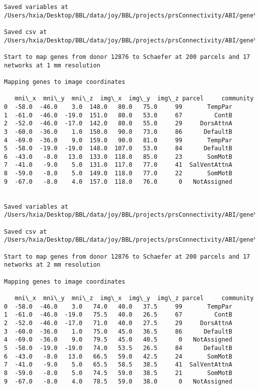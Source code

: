 \documentclass[11pt]{article}
\begin{document}
\begin{Verbatim}[commandchars=\\\{\}]
Saved variables at /Users/hxia/Desktop/BBL/data/joy/BBL/projects/prsConnectivity/ABI/gene\_mapping/12876donor\_200Parcels\_7Network\_2mm.pkl

Saved csv at /Users/hxia/Desktop/BBL/data/joy/BBL/projects/prsConnectivity/ABI/gene\_mapping/12876donor\_200Parcels\_7Network\_2mm.csv

Start to map genes from donor 12876 to Schaefer at 200 parcels and 17 networks at 1 mm resolution

Mapping genes to image coordinates

   mni\_x  mni\_y  mni\_z  img\_x  img\_y  img\_z parcel     community
0  -58.0  -46.0    3.0  148.0   80.0   75.0     99       TempPar
1  -61.0  -46.0  -19.0  151.0   80.0   53.0     67         ContB
2  -52.0  -46.0  -17.0  142.0   80.0   55.0     29     DorsAttnA
3  -60.0  -36.0    1.0  150.0   90.0   73.0     86      DefaultB
4  -69.0  -36.0    9.0  159.0   90.0   81.0     99       TempPar
5  -58.0  -19.0  -19.0  148.0  107.0   53.0     84      DefaultB
6  -43.0   -8.0   13.0  133.0  118.0   85.0     23       SomMotB
7  -41.0   -9.0    5.0  131.0  117.0   77.0     41  SalVentAttnA
8  -59.0   -8.0    5.0  149.0  118.0   77.0     22       SomMotB
9  -67.0   -8.0    4.0  157.0  118.0   76.0      0   NotAssigned


Saved variables at /Users/hxia/Desktop/BBL/data/joy/BBL/projects/prsConnectivity/ABI/gene\_mapping/12876donor\_200Parcels\_17Network\_1mm.pkl

Saved csv at /Users/hxia/Desktop/BBL/data/joy/BBL/projects/prsConnectivity/ABI/gene\_mapping/12876donor\_200Parcels\_17Network\_1mm.csv

Start to map genes from donor 12876 to Schaefer at 200 parcels and 17 networks at 2 mm resolution

Mapping genes to image coordinates

   mni\_x  mni\_y  mni\_z  img\_x  img\_y  img\_z parcel     community
0  -58.0  -46.0    3.0   74.0   40.0   37.5     99       TempPar
1  -61.0  -46.0  -19.0   75.5   40.0   26.5     67         ContB
2  -52.0  -46.0  -17.0   71.0   40.0   27.5     29     DorsAttnA
3  -60.0  -36.0    1.0   75.0   45.0   36.5     86      DefaultB
4  -69.0  -36.0    9.0   79.5   45.0   40.5      0   NotAssigned
5  -58.0  -19.0  -19.0   74.0   53.5   26.5     84      DefaultB
6  -43.0   -8.0   13.0   66.5   59.0   42.5     24       SomMotB
7  -41.0   -9.0    5.0   65.5   58.5   38.5     41  SalVentAttnA
8  -59.0   -8.0    5.0   74.5   59.0   38.5     21       SomMotB
9  -67.0   -8.0    4.0   78.5   59.0   38.0      0   NotAssigned



\end{Verbatim}
\end{document}
